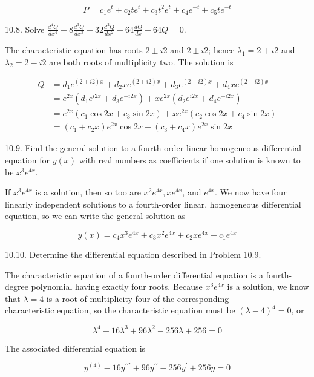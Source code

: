 \documentclass[10pt]{article}
\begin{document}
$$
P=c_{1} e^{t}+c_{2} t e^{t}+c_{3} t^{2} e^{t}+c_{4} e^{-t}+c_{5} t e^{-t}
$$

10.8. Solve $\frac{d^{4} Q}{d x^{4}}-8 \frac{d^{3} Q}{d x^{3}}+32 \frac{d^{2} Q}{d x^{2}}-64 \frac{d Q}{d x}+64 Q=0$.

The characteristic equation has roots $2 \pm i 2$ and $2 \pm i 2$; hence $\lambda_{1}=2+i 2$ and $\lambda_{2}=2-i 2$ are both roots of multiplicity two. The solution is

$$
\begin{aligned}
Q & =d_{1} e^{(2+i 2) x}+d_{2} x e^{(2+i 2) x}+d_{3} e^{(2-i 2) x}+d_{4} x e^{(2-i 2) x} \\
& =e^{2 x}\left(d_{1} e^{i 2 x}+d_{3} e^{-i 2 x}\right)+x e^{2 x}\left(d_{2} e^{i 2 x}+d_{4} e^{-i 2 x}\right) \\
& =e^{2 x}\left(c_{1} \cos 2 x+c_{3} \sin 2 x\right)+x e^{2 x}\left(c_{2} \cos 2 x+c_{4} \sin 2 x\right) \\
& =\left(c_{1}+c_{2} x\right) e^{2 x} \cos 2 x+\left(c_{3}+c_{4} x\right) e^{2 x} \sin 2 x
\end{aligned}
$$

10.9. Find the general solution to a fourth-order linear homogeneous differential equation for $y(x)$ with real numbers as coefficients if one solution is known to be $x^{3} e^{4 x}$.

If $x^{3} e^{4 x}$ is a solution, then so too are $x^{2} e^{4 x}, x e^{4 x}$, and $e^{4 x}$. We now have four linearly independent solutions to a fourth-order linear, homogeneous differential equation, so we can write the general solution as

$$
y(x)=c_{4} x^{3} e^{4 x}+c_{3} x^{2} e^{4 x}+c_{2} x e^{4 x}+c_{1} e^{4 x}
$$

10.10. Determine the differential equation described in Problem 10.9.

The characteristic equation of a fourth-order differential equation is a fourth-degree polynomial having exactly four roots. Because $x^{3} e^{4 x}$ is a solution, we know that $\lambda=4$ is a root of multiplicity four of the corresponding\\
characteristic equation, so the characteristic equation must be $(\lambda-4)^{4}=0$, or

$$
\lambda^{4}-16 \lambda^{3}+96 \lambda^{2}-256 \lambda+256=0
$$

The associated differential equation is

$$
y^{(4)}-16 y^{\prime \prime \prime}+96 y^{\prime \prime}-256 y^{\prime}+256 y=0
$$
\end{document}
